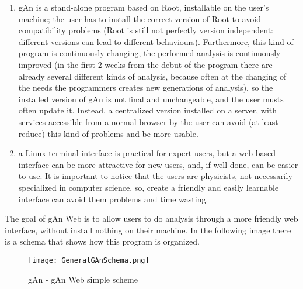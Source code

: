 \begin{enumerate}

\item gAn is a stand-alone program based on Root, installable on the user's machine; the user has to install the correct version of Root to avoid compatibility problems (Root is still not perfectly version independent: different versions can lead to different behaviours). Furthermore, this kind of program is continuously changing, the performed analysis is continuously improved (in the first 2 weeks from the debut of the program there are already several different kinds of analysis, because often at the changing of the needs the programmers creates new generations of analysis), so the installed version of gAn is not final and unchangeable, and the user musts often update it. Instead, a centralized version installed on a server, with services accessible from a normal browser by the user can avoid (at least reduce) this kind of problems and be more usable.    
 

\item a Linux terminal interface is practical for expert users, but a web based interface can be more attractive for new users, and, if well done, can be easier to use. It is important to notice that the users are physicists, not necessarily specialized in computer science, so, create a friendly and easily learnable interface can avoid them problems and time wasting.   


\end{enumerate}


The goal of gAn Web is to allow users to do analysis through a more friendly web interface, without install nothing on their machine. In the following image there is a schema that shows how this program is organized.

\begin{figure}[H]
\centering
\texttt{[image: GeneralGAnSchema.png]} 
\caption{gAn - gAn Web simple scheme}
\end{figure}



